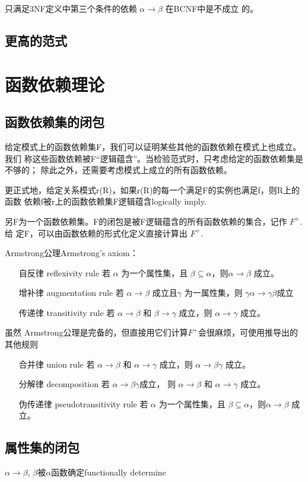 \documentclass{dingjia}
\begin{document}
只满足3NF定义中第三个条件的依赖 $\alpha \rightarrow \beta$ 在BCNF中是不成立
的。

\subsection{更高的范式}

\section{函数依赖理论}

\subsection{函数依赖集的闭包}

给定模式上的函数依赖集F，我们可以证明某些其他的函数依赖在模式上也成立。我们
称这些函数依赖被F“逻辑蕴含”。当检验范式时，只考虑给定的函数依赖集是不够的；
除此之外，还需要考虑模式上成立的所有函数依赖。

更正式地，给定关系模式r(R)，如果r(R)的每一个满足F的实例也满足f，则R上的函数
依赖f被r上的函数依赖集F逻辑蕴含logically imply.

另F为一个函数依赖集。F的闭包是被F逻辑蕴含的所有函数依赖的集合，记作 $F^+$.给
定F，可以由函数依赖的形式化定义直接计算出 $F^+$.

Armstrong公理Armstrong's axiom：
\begin{itemize}
\item[自反律 reflexivity rule] 若 $\alpha$ 为一个属性集，且 $\beta \subseteq
  \alpha$，则$\alpha \rightarrow \beta$ 成立。
\item[增补律 augmentation rule] 若 $\alpha \rightarrow \beta$ 成立且$\gamma$
  为一属性集，则 $\gamma\alpha \rightarrow \gamma\beta$成立
\item[传递律 transitivity rule] 若 $\alpha \rightarrow \beta$ 和 $\beta
  \rightarrow \gamma$ 成立，则 $\alpha \rightarrow \gamma$ 成立。
\end{itemize}

虽然 Armstrong公理是完备的，但直接用它们计算$F^+$会很麻烦，可使用推导出的其他规则
\begin{itemize}
\item[合并律 union rule] 若 $\alpha \rightarrow \beta$ 和 $\alpha
  \rightarrow \gamma$ 成立，则 $\alpha \rightarrow \beta\gamma$ 成立。
\item[分解律 decomposition] 若 $\alpha \rightarrow \beta\gamma$成立，
  则 $\alpha \rightarrow \beta$ 和 $\alpha \rightarrow \gamma$ 成立。
\item[伪传递律 pseudotransitivity rule] 若 $\alpha$ 为一个属性集，且 $\beta
  \subseteq \alpha$，则$\alpha \rightarrow \beta$ 成立。
\end{itemize}

\subsection{属性集的闭包}

$\alpha \rightarrow \beta$, $\beta$被$\alpha$函数确定functionally determine
\end{document}
